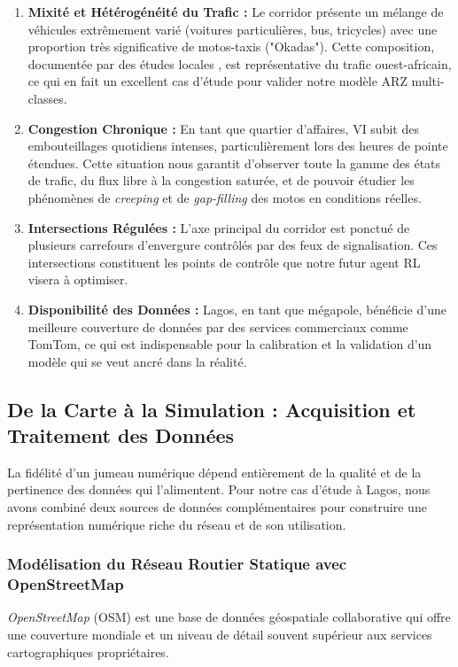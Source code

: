 \begin{enumerate}
       \item \textbf{Mixité et Hétérogénéité du Trafic :} Le corridor présente un mélange de véhicules extrêmement varié (voitures particulières, bus, tricycles) avec une proportion très significative de motos-taxis ("Okadas"). Cette composition, documentée par des études locales \parencite{LUDI:2020}, est représentative du trafic ouest-africain, ce qui en fait un excellent cas d'étude pour valider notre modèle ARZ multi-classes.

       \item \textbf{Congestion Chronique :} En tant que quartier d'affaires, VI subit des embouteillages quotidiens intenses, particulièrement lors des heures de pointe étendues. Cette situation nous garantit d'observer toute la gamme des états de trafic, du flux libre à la congestion saturée, et de pouvoir étudier les phénomènes de \textit{creeping} et de \textit{gap-filling} des motos en conditions réelles.

       \item \textbf{Intersections Régulées :} L'axe principal du corridor est ponctué de plusieurs carrefours d'envergure contrôlés par des feux de signalisation. Ces intersections constituent les points de contrôle que notre futur agent RL visera à optimiser.

       \item \textbf{Disponibilité des Données :} Lagos, en tant que mégapole, bénéficie d'une meilleure couverture de données par des services commerciaux comme TomTom, ce qui est indispensable pour la calibration et la validation d'un modèle qui se veut ancré dans la réalité.
\end{enumerate}

\subsection{De la Carte à la Simulation : Acquisition et Traitement des Données}
\label{sec:data_acquisition}

La fidélité d'un jumeau numérique dépend entièrement de la qualité et de la pertinence des données qui l'alimentent. Pour notre cas d'étude à Lagos, nous avons combiné deux sources de données complémentaires pour construire une représentation numérique riche du réseau et de son utilisation.

\subsubsection{Modélisation du Réseau Routier Statique avec OpenStreetMap}
\textit{OpenStreetMap} (OSM) est une base de données géospatiale collaborative qui offre une couverture mondiale et un niveau de détail souvent supérieur aux services cartographiques propriétaires.

